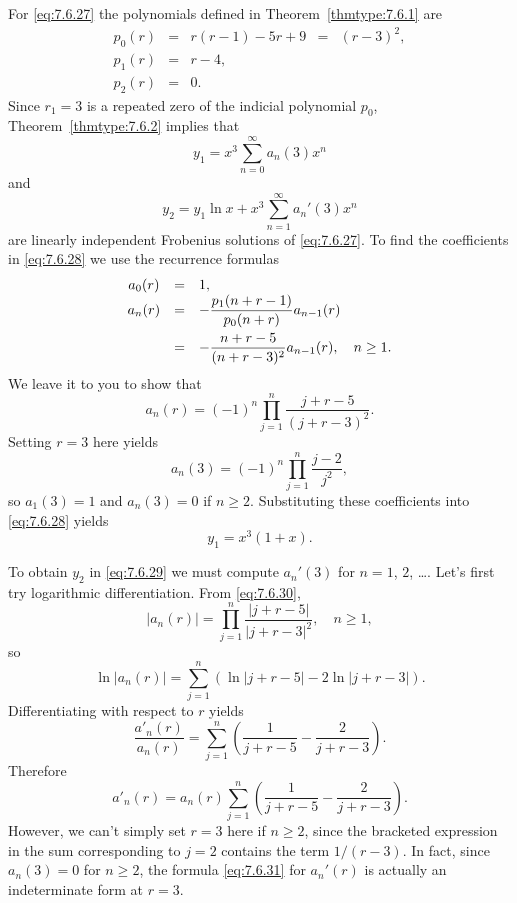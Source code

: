 \begin{examplesolution}
\solution For \eqref{eq:7.6.27} the polynomials defined in Theorem~\ref{thmtype:7.6.1} are
\[
  \begin{array}{ccccc}
    p_{0}(r) & = & r(r-1)-5r+9 & = & (r-3)^{2}, \\[5pt]
    p_{1}(r) & = & r-4,         \\[5pt]
    p_{2}(r) & = & 0.
  \end{array}
\]
Since $r_{1}=3$ is a repeated zero of the indicial polynomial $p_{0}$, Theorem~\ref{thmtype:7.6.2}
implies that
\begin{equation}
  \label{eq:7.6.28}y_{1}=x^{3}\sum_{n=0}^{\infty}a_{n}(3)x^{n}
\end{equation}
and
\begin{equation}
  \label{eq:7.6.29}y_{2}=y_{1}\ln x+x^{3}\sum_{n=1}^{\infty}a_{n}'(3)x^{n}
\end{equation}
are linearly independent Frobenius solutions of \eqref{eq:7.6.27}. To find the coefficients in
\eqref{eq:7.6.28} we use the recurrence formulas
\[
  \begin{array}{ccl}
    a_{0}(r) & = & 1,                                                    \\
    a_{n}(r) & = & -\displaystyle\frac{p_{1}(n+r-1)}{p_{0}(n+r)}a_{n-1}(r)        \\[10pt]
             & = & -\displaystyle\frac{n+r-5}{(n+r-3)^{2}}a_{n-1}(r),\quad n\ge1.
  \end{array}
\]
We leave it to you to show that
\begin{equation}
  \label{eq:7.6.30}a_{n}(r)=(-1)^{n}\prod_{j=1}^{n}\frac{j+r-5}{(j+r-3)^{2}}.
\end{equation}
Setting $r=3$ here yields
\[
  a_{n}(3)=(-1)^{n}\prod_{j=1}^{n}\frac{j-2}{j^{2}},
\]
so $a_{1}(3)=1$ and $a_{n}(3)=0$ if $n\ge2$. Substituting these coefficients into \eqref{eq:7.6.28}
yields
\[
  y_{1}=x^{3}(1+x).
\]

To obtain $y_{2}$ in \eqref{eq:7.6.29} we must compute $a_{n}'(3)$ for $n=1$, $2$, \dots. Let's
first try logarithmic differentiation. From \eqref{eq:7.6.30},
\[
  |a_{n}(r)|=\prod_{j=1}^{n}\frac{|j+r-5|}{|j+r-3|^{2}},\quad n\ge1,
\]
so
\[
  \ln|a_{n}(r)|=\sum^{n}_{j=1}\left(\ln|j+r-5|-2\ln|j+r-3|\right).
\]
Differentiating with respect to $r$ yields
\[
  \frac{a'_{n}(r)}{a_{n}(r)}=\sum^{n}_{j=1}\left(\frac{1}{j+r-5}-\frac{2}{j+r-3}\right).
\]
Therefore
\begin{equation}
  \label{eq:7.6.31}a'_{n}(r)=a_{n}(r)\sum^{n}_{j=1}\left(\frac{1}{j+r-5}-\frac{2}{j+r-3}\right).
\end{equation}
However, we can't simply set $r=3$ here if $n\ge2$, since the bracketed expression in the sum
corresponding to $j=2$ contains the term $1/(r-3)$. In fact, since $a_{n}(3)=0$ for $n\ge2$, the
formula \eqref{eq:7.6.31} for $a_{n}'(r)$ is actually an indeterminate form at $r=3$.


\end{examplesolution}
